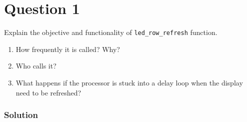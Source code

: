 \section*{Question 1}

Explain the objective and functionality of \texttt{led\_row\_refresh} function.

\begin{enumerate}[label= (\alph*), noitemsep, topsep=0pt]
    \item How frequently it is called? Why?
    \item Who calls it?
    \item What happens if the processor is stuck into a delay loop when the display need to be refreshed?
\end{enumerate}

\subsubsection*{Solution}

